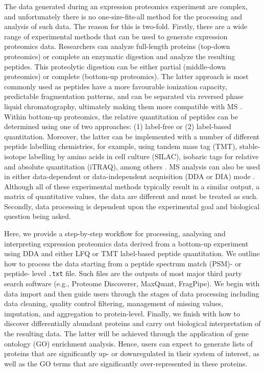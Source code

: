 \documentclass[9pt,a4paper,]{extarticle}
\begin{document}
The data generated during an expression proteomics experiment are complex, and
unfortunately there is no one-size-fits-all method for the processing and analysis
of such data. The reason for this is two-fold. Firstly, there are a wide range
of experimental methods that can be used to generate expression proteomics data.
Researchers can analyze full-length proteins (top-down proteomics) or complete
an enzymatic digestion and analyze the resulting peptides. This proteolytic
digestion can be either partial (middle-down proteomics) or complete (bottom-up
proteomics). The latter approach is most commonly used as peptides have a more
favourable ionization capacity, predictable fragmentation patterns, and can be
separated via reversed phase liquid chromatography, ultimately making them more
compatible with MS \citep{Dupree2020}. Within bottom-up proteomics, the relative
quantitation of peptides can be determined using one of two approaches: (1)
label-free or (2) label-based quantitation. Moreover, the latter can be
implemented with a number of different peptide labelling chemistries, for example,
using tandem mass tag (TMT), stable-isotope labelling by amino acids in cell
culture (SILAC), isobaric tags for relative and absolute quantitation (iTRAQ),
among others \citep{Obermaier2015}. MS analysis can also be used in either data-dependent
or data-independent acquisition (DDA or DIA) mode \citep{FernndezCosta2020, Hu2016}.
Although all of these experimental methods typically result in a similar output,
a matrix of quantitative values, the data are different and must be treated as such.
Secondly, data processing is dependent upon the experimental goal and biological
question being asked.

Here, we provide a step-by-step workflow for processing, analysing and
interpreting expression proteomics data derived from a bottom-up experiment
using DDA and either LFQ or TMT label-based peptide quantitation. We outline how
to process the data starting from a peptide spectrum match (PSM)- or peptide-
level \texttt{.txt} file. Such files are the outputs of most major third party search
software (e.g., Proteome Discoverer, MaxQuant, FragPipe). We begin with data
import and then guide users through the stages of data processing including data
cleaning, quality control filtering, management of missing values, imputation,
and aggregation to protein-level. Finally, we finish with how to discover
differentially abundant proteins and carry out biological interpretation of the
resulting data. The latter will be achieved through the application of gene
ontology (GO) enrichment analysis. Hence, users can expect to generate lists of
proteins that are significantly up- or downregulated in their system of interest,
as well as the GO terms that are significantly over-represented in these proteins.
\end{document}
